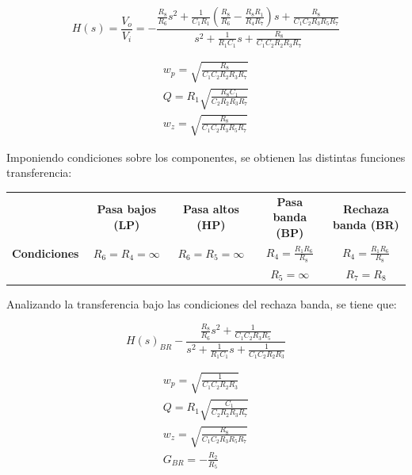 \begin{equation}
        H(s) = \frac{V_{o}}{V_{i}} = -\frac{\frac{R_{8}}{R_{6}}s^{2}+\frac{1}{C_{1}R_{1}}(\frac{R_{8}}{R_{6}}-\frac{R_{8}R_{1}}{R_{4}R_{7}})s + \frac{R_{8}}{C_{1}C_{2}R_{3}R_{5}R_{7}}}{s^{2} + \frac{1}{R_{1}C_{1}} s + \frac{R_{8}}{C_{1}C_{2}R_{2}R_{3}R_{7}}}
    \label{eq:FT1}
\end{equation}

\begin{equation}
    \begin{matrix}
        w_{p} = \sqrt{\frac{R_{8}}{C_{1}C_{2}R_{2}R_{3}R_{7}}}
        \\
        Q = R_{1}\sqrt{\frac{R_{8}C_{1}}{C_{2}R_{2}R_{3}R_{7}}}
        \\
        w_{z} = \sqrt{\frac{R_{8}}{C_{1}C_{2}R_{3}R_{5}R_{7}}}
    \end{matrix}
    \label{eq:FT2}
\end{equation}

Imponiendo condiciones sobre los componentes, se obtienen las distintas funciones transferencia:

\begin{table}[H]
\begin{tabular}{c|cccc}
                     & \textbf{Pasa bajos (LP)} & \textbf{Pasa altos (HP)} & \textbf{Pasa banda (BP)}           & \textbf{Rechaza banda (BR)}        \\ \cline{2-5} 
\textbf{Condiciones} & $R_{6} = R_{4} = \infty$ & $R_{6} = R_{5} = \infty$ & $R_{4} = \frac{R_{1}R_{6}}{R_{8}}$ & $R_{4} = \frac{R_{1}R_{6}}{R_{8}}$ \\
                     &                          &                          & $R_{5} = \infty$                   & $R_{7} = R_{8}$                   
\end{tabular}
\end{table}

Analizando la transferencia bajo las condiciones del rechaza banda, se tiene que:

\begin{equation}
        H(s)_{BR} -\frac{\frac{R_{8}}{R_{6}}s^{2} + \frac{1}{C_{1}C_{2}R_{3}R_{5}}}{s^{2} + \frac{1}{R_{1}C_{1}} s + \frac{1}{C_{1}C_{2}R_{2}R_{3}}}
    \label{eq:FT3}
\end{equation}

\begin{equation}
    \begin{matrix}
        w_{p} = \sqrt{\frac{1}{C_{1}C_{2}R_{2}R_{3}}}
        \\
        Q = R_{1}\sqrt{\frac{C_{1}}{C_{2}R_{2}R_{3}R_{7}}}
        \\
        w_{z} = \sqrt{\frac{R_{8}}{C_{1}C_{2}R_{3}R_{5}R_{7}}}
        \\
        G_{BR} = -\frac{R_{2}}{R_{5}}

    \end{matrix}
    \label{eq:FT4}
\end{equation}

